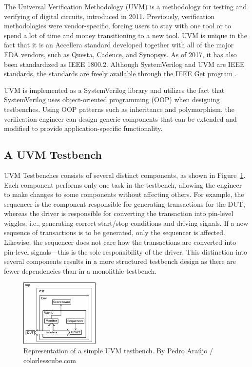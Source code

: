 \documentclass[conference]{IEEEtran}
\begin{document}
The Universal Verification Methodology (UVM) is a methodology for testing and verifying of digital circuits, introduced in 2011. Previously, verification methodologies were vendor-specific, forcing users to stay with one tool or to spend a lot of time and money transitioning to a new tool. UVM is unique in the fact that it is an Accellera standard developed together with all of the major EDA vendors, such as Questa, Cadence, and Synopsys. As of 2017, it has also been standardized as IEEE 1800.2. Although SystemVerilog and UVM are IEEE standards, the standards are freely available through the IEEE Get program \cite{IEEE:18002}.

UVM is implemented as a SystemVerilog library and utilizes the fact that SystemVerilog uses object-oriented programming (OOP) when designing testbenches.
Using OOP patterns such as inheritance and polymorphism, the verification engineer can design generic components that can be extended and modified to provide application-specific functionality.

\subsection{A UVM Testbench}
UVM Testbenches consists of several distinct components, as shown in Figure~\ref{fig:uvm_testbench}. Each component performs only one task in the testbench, allowing the engineer to make changes to some components without affecting others. 
For example, the sequencer is the component responsible for generating transactions for the DUT, whereas the driver is responsible for converting the transaction into pin-level wiggles, i.e., generating correct start/stop conditions and
driving signals. If a new sequence of transactions is to be generated, only the sequencer is affected. Likewise, the sequencer does not care how the transactions are converted into pin-level signals---this is the sole responsibility of the driver. This distinction into several components results in a more structured testbench design as there are fewer dependencies than in a monolithic testbench.

\begin{figure}
    \centering
    \includegraphics[width=0.35\textwidth]{uvm-tb_Pedro-Araujo.png}
    \caption{Representation of a simple UVM testbench. By Pedro Araújo / colorlesscube.com}
    \label{fig:uvm_testbench}
\end{figure}
\end{document}
